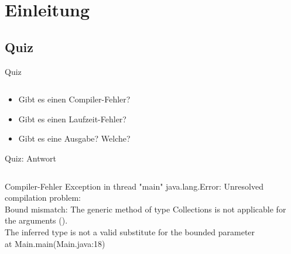 \documentclass[usepdftitle=false,hyperref={pdfpagelabels=false}]{beamer}
\begin{document}
\title{\titleText}
\subtitle{Sortieren, equals(), hashCode(), abstrakte Klassen, finale Klassen}
\author{\tutor}
\date{\today}
\subject{Programmieren}

\frame{\titlepage}


\section{Einleitung}
\subsection{Quiz}
\begin{frame}{Quiz}
    \inputminted[linenos=true, numbersep=5pt, tabsize=4, fontsize=\tiny]{java}{QuizMain.java}
    \begin{itemize}
        \item Gibt es einen Compiler-Fehler?
        \item Gibt es einen Laufzeit-Fehler?
        \item Gibt es eine Ausgabe? Welche?
    \end{itemize}
\end{frame}

\begin{frame}{Quiz: Antwort}
    \inputminted[linenos=true, numbersep=5pt, tabsize=4, fontsize=\tiny, firstnumber=7, firstline=7, lastline=19, ]{java}{QuizMain.java}
    \begin{block}{Compiler-Fehler}
        {\small
        Exception in thread "main" java.lang.Error: Unresolved compilation problem:\\
        Bound mismatch: The generic method  of
        type Collections is not applicable for the arguments
        ().\\
        The inferred type  is not a valid substitute for
        the bounded parameter \\
        at Main.main(Main.java:18)}
    \end{block}
\end{frame}
\end{document}
